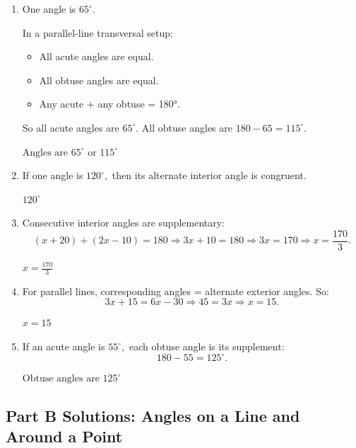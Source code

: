 \documentclass[14pt]{extarticle}
\begin{document}
\begin{enumerate}
  \item One angle is \(65^\circ.\)

  In a parallel-line transversal setup:
  \begin{itemize}
    \item All acute angles are equal.
    \item All obtuse angles are equal.
    \item Any acute + any obtuse = 180°.
  \end{itemize}

  So all acute angles are \(65^\circ.\)  
  All obtuse angles are \(180 - 65 = 115^\circ.\)

  \(\boxed{\text{Angles are }65^\circ \text{ or }115^\circ}\)

  \item If one angle is \(120^\circ,\) then its alternate interior angle is congruent.

  \(\boxed{120^\circ}\)

  \item Consecutive interior angles are supplementary:
  \[
  (x + 20) + (2x - 10) = 180
  \Rightarrow 3x + 10 = 180
  \Rightarrow 3x = 170
  \Rightarrow x = \frac{170}{3}.
  \]

  \(\boxed{x = \tfrac{170}{3}}\)

  \item For parallel lines, corresponding angles = alternate exterior angles.  
  So:
  \[
  3x + 15 = 6x - 30
  \Rightarrow 45 = 3x
  \Rightarrow x = 15.
  \]

  \(\boxed{x = 15}\)

  \item If an acute angle is \(55^\circ,\) each obtuse angle is its supplement:
  \[
  180 - 55 = 125^\circ.
  \]

  \(\boxed{\text{Obtuse angles are }125^\circ}\)
\end{enumerate}

\subsection*{Part B Solutions: Angles on a Line and Around a Point}
\end{document}
